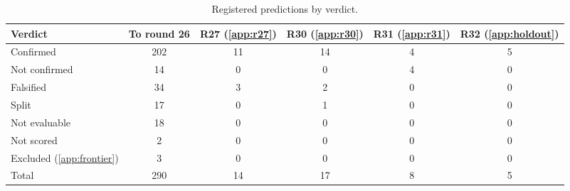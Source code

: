 \begin{table}[htbp]
\centering
\caption{Registered predictions by verdict.}
\label{tab:ledger-totals}
\footnotesize
\begin{tabular}{lccccc}
\toprule
Verdict & To round 26 & R27 (\cref{app:r27}) & R30 (\cref{app:r30}) & R31 (\cref{app:r31}) & R32 (\cref{app:holdout}) \\
\midrule
Confirmed & 202 & 11 & 14 & 4 & 5 \\
Not confirmed & 14 & 0 & 0 & 4 & 0 \\
Falsified & 34 & 3 & 2 & 0 & 0 \\
Split & 17 & 0 & 1 & 0 & 0 \\
Not evaluable & 18 & 0 & 0 & 0 & 0 \\
Not scored & 2 & 0 & 0 & 0 & 0 \\
Excluded (\cref{app:frontier}) & 3 & 0 & 0 & 0 & 0 \\
\midrule
Total & 290 & 14 & 17 & 8 & 5 \\
\bottomrule
\end{tabular}
\end{table}

